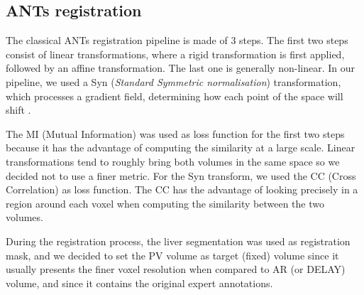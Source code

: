 \subsection{ANTs registration}\label{tcia-db-ants-registration}

The classical ANTs registration pipeline is made of 3 steps. The first
two steps consist of linear transformations, where a rigid
transformation is first applied, followed by an affine transformation.
The last one is generally non-linear. In our pipeline,
we used a Syn (\emph{Standard Symmetric normalisation}) transformation, which
processes a gradient field, determining how each point of the space will
shift \cite{Avants2008}.

The MI (Mutual Information) was used as loss function for the first two
steps because it has the advantage of computing the similarity at a
large scale. Linear transformations tend to roughly bring both volumes
in the same space so we decided not to use a finer metric. For the Syn
transform, we used the CC (Cross Correlation) as loss function. The CC
has the advantage of looking precisely in a region around each voxel
when computing the similarity between the two volumes.

During the registration process, the liver segmentation was used as
registration mask, and we decided to set the PV volume as target (fixed)
volume since it usually presents the finer voxel resolution when
compared to AR (or DELAY) volume, and since it contains the original
expert annotations.

